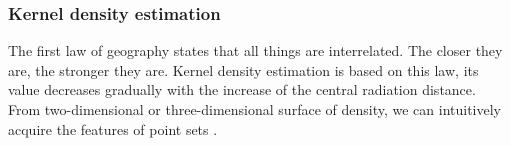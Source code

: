 \documentclass[11pt]{report}
\begin{document}
	
	\subsubsection{Kernel density estimation}
	The first law of geography states that all things are interrelated. The closer they are, the stronger they are. Kernel density estimation is based on this law, its value decreases gradually with the increase of the central radiation distance. From two-dimensional or three-dimensional surface of density, we can intuitively acquire the features of point sets \cite{1990}. 
	
\end{document}
